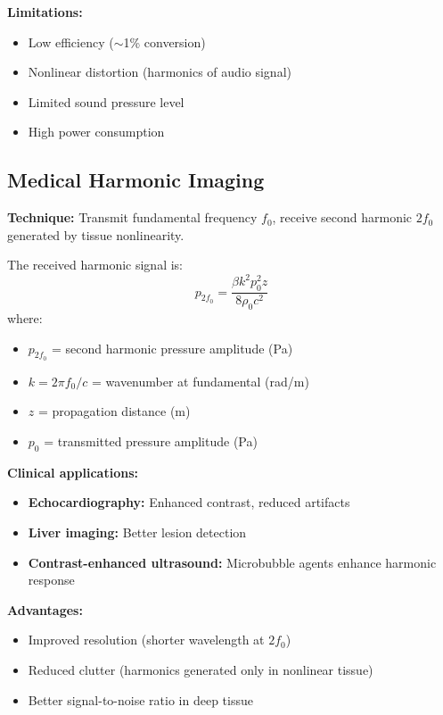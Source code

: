 \textbf{Limitations:}
\begin{itemize}
\item Low efficiency ($\sim$1\% conversion)
\item Nonlinear distortion (harmonics of audio signal)
\item Limited sound pressure level
\item High power consumption
\end{itemize}

\subsection{Medical Harmonic Imaging}

\textbf{Technique:} Transmit fundamental frequency $f_0$, receive second harmonic $2f_0$ generated by tissue nonlinearity.

The received harmonic signal is:
\begin{equation}
p_{2f_0} = \frac{\beta k^2 p_0^2 z}{8\rho_0 c^2}
\end{equation}
where:
\begin{itemize}
\item $p_{2f_0}$ = second harmonic pressure amplitude (Pa)
\item $k = 2\pi f_0/c$ = wavenumber at fundamental (rad/m)
\item $z$ = propagation distance (m)
\item $p_0$ = transmitted pressure amplitude (Pa)
\end{itemize}

\textbf{Clinical applications:}
\begin{itemize}
\item \textbf{Echocardiography:} Enhanced contrast, reduced artifacts
\item \textbf{Liver imaging:} Better lesion detection
\item \textbf{Contrast-enhanced ultrasound:} Microbubble agents enhance har\-mon\-ic response
\end{itemize}

\textbf{Advantages:}
\begin{itemize}
\item Improved resolution (shorter wavelength at $2f_0$)
\item Reduced clutter (harmonics generated only in nonlinear tissue)
\item Better signal-to-noise ratio in deep tissue
\end{itemize}

